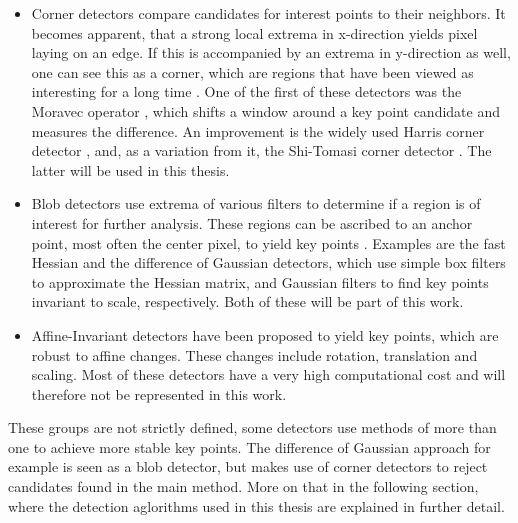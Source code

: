 \documentclass[Bachelorarbeit.tex]{subfiles}
\begin{document}
\begin{itemize}
	\item Corner detectors compare candidates for interest points to their neighbors. It becomes apparent, that a strong local extrema in x-direction yields pixel laying on an edge. If this is accompanied by an extrema in y-direction as well, one can see this as a corner, which are regions that have been viewed as interesting for a long time \citep[p. 337]{gauglitz2011evaluation}. One of the first of these detectors was the Moravec operator \citep[p.337] {gauglitz2011evaluation}, which shifts a window around a key point candidate and measures the difference. An improvement is the widely used Harris corner detector \citep{harris1988combined}, and, as a variation from it, the Shi-Tomasi corner detector \citep{shi1993good}. The latter will be used in this thesis.
	
	\item Blob detectors use extrema of various filters to determine if a region is of interest for further analysis. These regions can be ascribed to an anchor point, most often the center pixel, to yield key points \citep[p. 338]{gauglitz2011evaluation}. Examples are the fast Hessian \cite{bay2006surf} and the difference of Gaussian \citep{lowe2004distinctive} detectors, which use simple box filters to approximate the Hessian matrix, and Gaussian filters to find key points invariant to scale, respectively. Both of these will be part of this work.
	
	\item Affine-Invariant detectors have been proposed to yield key points, which are robust to affine changes. These changes include rotation, translation and scaling. Most of these detectors have a very high computational cost and will therefore not be represented in this work. 
\end{itemize}
These groups are not strictly defined, some detectors use methods of more than one to achieve more stable key points. The difference of Gaussian approach for example is seen as a blob detector, but makes use of corner detectors to reject candidates found in the main method. More on that in the following section, where the detection aglorithms used in this thesis are explained in further detail.

\FloatBarrier
\end{document}
